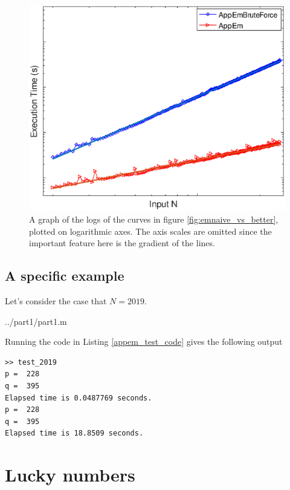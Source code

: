 \documentclass[10pt]{article}
\begin{document}
\begin{figure}[!hb]

   \includegraphics[scale=0.5]{bruteforce_vs_better_logs.eps}

   \caption{A graph of the logs of the curves in figure \ref{fig:emnaive_vs_better}, plotted on logarithmic axes. The axis scales are omitted since the important feature here is the gradient of the lines.}
      \label{loglog}
\end{figure}

\subsection{A specific example}

Let's consider the case that $N = 2019$. 

   {../part1/part1.m}
  
Running the code in Listing \ref{appem_test_code} gives the following output

\begin{verbatim}
>> test_2019
p =  228
q =  395
Elapsed time is 0.0487769 seconds.
p =  228
q =  395
Elapsed time is 18.8509 seconds.
\end{verbatim}

\section{Lucky numbers}
\end{document}
